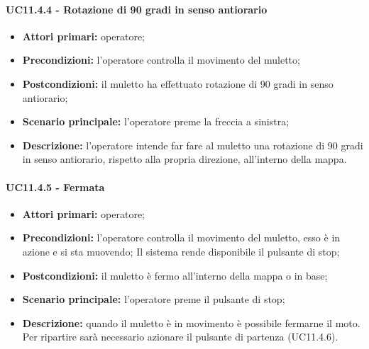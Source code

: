 \paragraph{UC11.4.4 - Rotazione di 90 gradi in senso antiorario}
\begin{itemize}
	\item 	\textbf{Attori primari:} operatore;
	\item 	\textbf{Precondizioni:} l'operatore controlla il movimento del muletto;
	\item 	\textbf{Postcondizioni:} il muletto ha effettuato rotazione di 90 gradi in senso antiorario; 
	\item 	\textbf{Scenario principale:} l'operatore preme la freccia a sinistra;
	\item 	\textbf{Descrizione:} l'operatore intende far fare al muletto una rotazione di 90 gradi in senso antiorario, rispetto alla propria direzione, all'interno della mappa.
\end{itemize}


\paragraph{UC11.4.5 - Fermata}
\begin{itemize}
	\item 	\textbf{Attori primari:} operatore;
	\item 	\textbf{Precondizioni:} l'operatore controlla il movimento del muletto, esso è in azione e si sta muovendo; Il sistema rende disponibile il pulsante di stop;
	\item 	\textbf{Postcondizioni:} il muletto è fermo all'interno della mappa o in base;
	\item 	\textbf{Scenario principale:} l'operatore preme il pulsante di stop;
	\item 	\textbf{Descrizione:} quando il muletto è in movimento è possibile fermarne il moto. Per ripartire sarà necessario azionare il pulsante di partenza (UC11.4.6).
\end{itemize}


